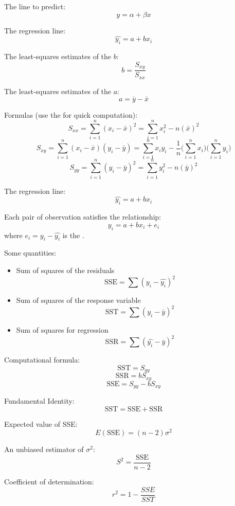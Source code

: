 \clearpage
\begin{multicols}{3}


  \par The line to predict:
    \[
      y = \alpha + \beta x
    \]
  \par The regression line:
    \[
      \hat{y_i} = a + bx_i
    \]
  \par The least-squares estimates of the  $b$:
    \[
      b = \frac{S_{xy}}{S_{xx}}
    \]
  \par The least-squares estimates of the  $a$:
    \[
      a = \bar{y} - \bar{x}
    \]
  \par Formulas (use the  for quick computation):
    \[
      S_{xx} = \sum\limits_{i = 1}^{n} (x_i - \bar{x})^2
             = \sum\limits_{i = 1}^{n} x_i^2 - n(\bar{x})^2
    \]
    \[
      S_{xy} = \sum\limits_{i = 1}^{n} (x_i - \bar{x})(y_i - \bar{y})
             = \sum\limits_{i = 1}^{n} x_i y_i - \frac{1}{n}
                             \bigg(\sum\limits_{i = 1}^{n} x_i \bigg)
                             \bigg(\sum\limits_{i = 1}^{n} y_i \bigg)
    \]
    \[
      S_{yy} = \sum\limits_{i = 1}^{n} (y_i - \bar{y})^2
             = \sum\limits_{i = 1}^{n} y_i^2 - n(\bar{y})^2
    \]

  \par The regression line:
    \[
      \hat{y_i} = a + bx_i
    \]
  \par Each pair of observation satisfies the relationship:
    \[
      y_i = a + bx_i + e_i
    \]
    where $e_i = y_i - \hat{y_i}$ is the .
  \par Some quantities:
    \begin{itemize}
      \item Sum of squares of the residuals
    \[
      \text{SSE} = \sum (y_i - \hat{y_i})^2
    \]
      \item Sum of squares of the response variable
    \[
      \text{SST} = \sum (y_i - \bar{y})^2
    \]
      \item Sum of squares for regression
    \[
      \text{SSR} = \sum (\hat{y_i} - \bar{y})^2
    \]
    \end{itemize}
  \par Computational formula:
    \[
      \text{SST} = S_{yy}
    \]
    \[
      \text{SSR} = bS_{xy}
    \]
    \[
      \text{SSE} = S_{yy} - bS_{xy}
    \]
  \par Fundamental Identity:
    \[
      \text{SST} = \text{SSE} + \text{SSR}
    \]
  \par Expected value of SSE:
    \[
      E(\text{SSE}) = (n - 2)\sigma^2
    \]
  \par An unbiased estimator of $\sigma^2$:
    \[
      S^2 = \frac{\text{SSE}}{n - 2}
    \]
  \par Coefficient of determination:
    \[
      r^2 = 1 - \frac{SSE}{SST}
    \]


\end{multicols}
